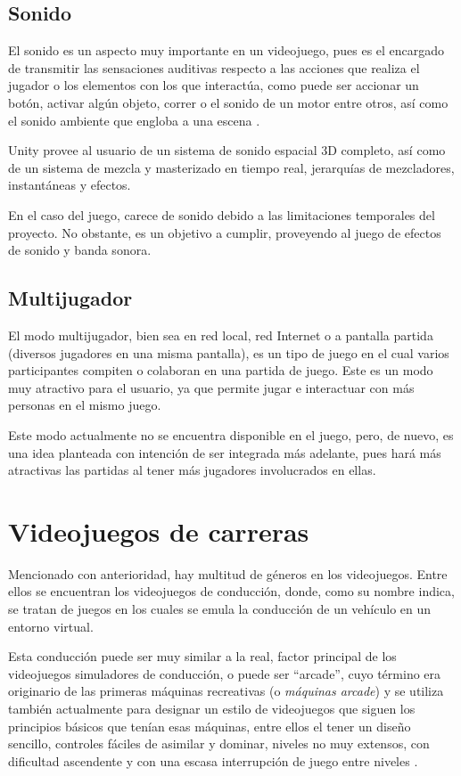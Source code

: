 \subsection{Sonido}

El sonido es un aspecto muy importante en un videojuego, pues es el encargado de transmitir las sensaciones auditivas respecto a las acciones que realiza el jugador o los elementos con los que interactúa, como puede ser accionar un botón, activar algún objeto, correr o el sonido de un motor entre otros, así como el sonido ambiente que engloba a una escena \cite{doc:sound}.

Unity provee al usuario de un sistema de sonido espacial 3D completo, así como de un sistema de mezcla y masterizado en tiempo real, jerarquías de mezcladores, instantáneas y efectos.

En el caso del juego, carece de sonido debido a las limitaciones temporales del proyecto. No obstante, es un objetivo a cumplir, proveyendo al juego de efectos de sonido y banda sonora.

\subsection{Multijugador}

El modo multijugador, bien sea en red local, red Internet o a pantalla partida (diversos jugadores en una misma pantalla), es un tipo de juego en el cual varios participantes compiten o colaboran en una partida de juego. Este es un modo muy atractivo para el usuario, ya que permite jugar e interactuar con más personas en el mismo juego.

Este modo actualmente no se encuentra disponible en el juego, pero, de nuevo, es una idea planteada con intención de ser integrada más adelante, pues hará más atractivas las partidas al tener más jugadores involucrados en ellas.

\section{Videojuegos de carreras} 

Mencionado con anterioridad, hay multitud de géneros en los videojuegos. Entre ellos se encuentran los videojuegos de conducción, donde, como su nombre indica, se tratan de juegos en los cuales se emula la conducción de un vehículo en un entorno virtual. 

Esta conducción puede ser muy similar a la real, factor principal de los videojuegos simuladores de conducción, o puede ser ``arcade'', cuyo término era originario de las primeras máquinas recreativas (o \textit{máquinas arcade}) y se utiliza también actualmente para designar un estilo de videojuegos que siguen los principios básicos que tenían esas máquinas, entre ellos el tener un diseño sencillo, controles fáciles de asimilar y dominar, niveles no muy extensos, con dificultad ascendente y con una escasa interrupción de juego entre niveles \cite{wikij:arcade}.

